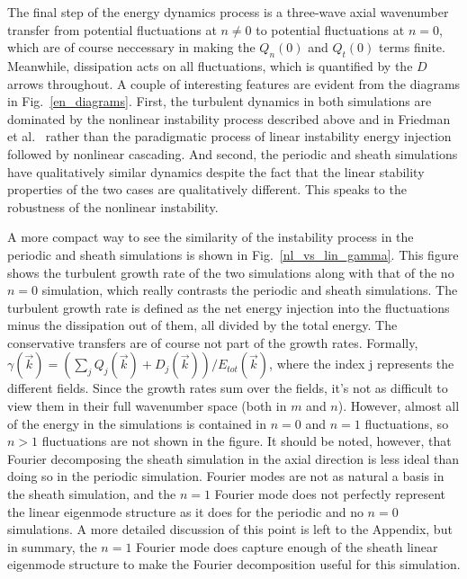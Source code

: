 \documentclass[showpacs,preprintnumbers,amsmath,amssymb,superscriptaddress,aip]{revtex4-1}
\begin{document}
The final step of the energy dynamics process is a three-wave axial wavenumber transfer from potential fluctuations at $n \ne 0$ to potential fluctuations at $n=0$, which are of course neccessary
in making the $Q_n(0)$ and $Q_t(0)$ terms finite. Meanwhile, dissipation acts on all fluctuations, which is quantified by the $D$ arrows throughout. A couple of interesting features are evident
from the diagrams in Fig.~\ref{en_diagrams}. 
First, the turbulent dynamics in both simulations are dominated by the nonlinear instability process described above and in Friedman et al.~\cite{friedman2012b}
rather than the paradigmatic process of linear instability energy injection followed by nonlinear cascading. And second,
the periodic and sheath simulations have qualitatively similar dynamics despite the fact that the linear stability properties of the two cases
are qualitatively different. This speaks to the robustness of the nonlinear instability.

A more compact way to see the similarity of the instability process in the periodic and sheath simulations is shown in Fig.~\ref{nl_vs_lin_gamma}. 
This figure shows the turbulent growth rate of the two simulations along with that of the no $n=0$ simulation, which really contrasts the periodic and sheath simulations. 
The turbulent growth rate is defined as the net energy injection
into the fluctuations minus the dissipation out of them, all divided by the total energy. The conservative transfers are of course not part of the growth rates.
Formally, $\gamma(\vec{k}) = (\sum_j Q_j(\vec{k}) + D_j(\vec{k}))/E_{tot}(\vec{k})$, where the index j represents the different fields.
Since the growth rates sum over the fields, it's not as difficult to view them in their full wavenumber space (both in $m$ and $n$). However, almost all of the energy in the simulations is 
contained in $n=0$ and $n=1$ fluctuations, so $n>1$ fluctuations are not shown in the figure. It should be noted, however, that Fourier decomposing the sheath simulation in the axial direction
is less ideal than doing so in the periodic simulation. Fourier modes are not as natural a basis in the sheath simulation, and the $n=1$ Fourier mode does not perfectly represent the linear
eigenmode structure as it does for the periodic and no $n=0$ simulations. 
A more detailed discussion of this point is left to the Appendix, but in summary, the $n=1$ Fourier mode does capture enough of the sheath
linear eigenmode structure to make the Fourier decomposition useful for this simulation.
\end{document}
